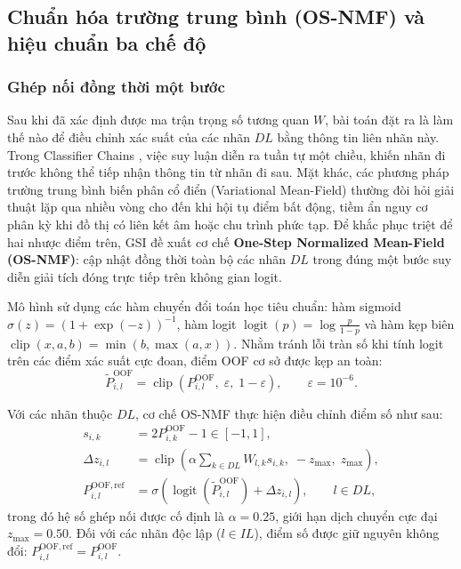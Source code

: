 \documentclass[11pt,a4paper]{article}
\begin{document}
\subsection{Chuẩn hóa trường trung bình (OS-NMF) và hiệu chuẩn ba chế độ}
\subsubsection{Ghép nối đồng thời một bước}
Sau khi đã xác định được ma trận trọng số tương quan \(W\), bài toán đặt ra là làm thế nào để điều chỉnh xác suất của các nhãn \(DL\) bằng thông tin liên nhãn này.
Trong Classifier Chains \cite{cc2011}, việc suy luận diễn ra tuần tự một chiều, khiến nhãn đi trước không thể tiếp nhận thông tin từ nhãn đi sau. Mặt khác, các phương pháp trường trung bình biến phân cổ điển (Variational Mean-Field) \cite{meanfield2008} thường đòi hỏi giải thuật lặp qua nhiều vòng cho đến khi hội tụ điểm bất động, tiềm ẩn nguy cơ phân kỳ khi đồ thị có liên kết âm hoặc chu trình phức tạp.
Để khắc phục triệt để hai nhược điểm trên, GSI đề xuất cơ chế \textbf{One-Step Normalized Mean-Field (OS-NMF)}: cập nhật đồng thời toàn bộ các nhãn \(DL\) trong đúng một bước suy diễn giải tích đóng trực tiếp trên không gian logit.

Mô hình sử dụng các hàm chuyển đổi toán học tiêu chuẩn: hàm sigmoid \(\sigma(z) = (1 + \exp(-z))^{-1}\), hàm logit \(\operatorname{logit}(p) = \log\frac{p}{1-p}\) và hàm kẹp biên \(\operatorname{clip}(x, a, b) = \min(b, \max(a, x))\). Nhằm tránh lỗi tràn số khi tính logit trên các điểm xác suất cực đoan, điểm OOF cơ sở được kẹp an toàn:
\begin{equation}
\widetilde P^{\mathrm{OOF}}_{i,l} = \operatorname{clip}\left(P^{\mathrm{OOF}}_{i,l}, \; \varepsilon, \; 1-\varepsilon\right), \qquad \varepsilon = 10^{-6}.
\label{eq:clip-oof}
\end{equation}

Với các nhãn thuộc \(DL\), cơ chế OS-NMF thực hiện điều chỉnh điểm số như sau:
\begin{align}
s_{i,k} &= 2 P^{\mathrm{OOF}}_{i,k} - 1 \in [-1, 1], \label{eq:spin} \\
\Delta z_{i,l} &= \operatorname{clip}\left(\alpha \sum_{k \in DL} W_{l,k} s_{i,k}, \; -z_{\max}, \; z_{\max}\right), \label{eq:delta-z} \\
P^{\mathrm{OOF,ref}}_{i,l} &= \sigma\left(\operatorname{logit}\left(\widetilde P^{\mathrm{OOF}}_{i,l}\right) + \Delta z_{i,l}\right), \qquad l \in DL, \label{eq:osnmf}
\end{align}
trong đó hệ số ghép nối được cố định là \(\alpha = 0.25\), giới hạn dịch chuyển cực đại \(z_{\max} = 0.50\). Đối với các nhãn độc lập (\(l \in IL\)), điểm số được giữ nguyên không đổi: \(P^{\mathrm{OOF,ref}}_{i,l} = P^{\mathrm{OOF}}_{i,l}\).
\end{document}
